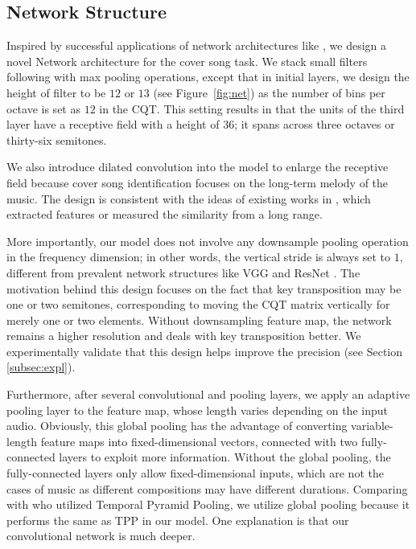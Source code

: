 \documentclass{article}
\newcommand{\figref}[1]{\mbox{Figure~\ref{#1}}}
\begin{document}
\subsection{Network Structure}



Inspired by successful applications of network architectures like \cite{simonyan2014very,he2016deep}, we design a novel Network architecture for the cover song task. We stack small filters following with max pooling operations, except that in initial layers, we design the height of filter to be $12$ or $13$ (see \figref{fig:net}) as the number of bins per octave is set as $12$ in the CQT.
This setting results in that the units of the third layer have a receptive field with a height of $36$; it spans across three octaves or thirty-six semitones. 

We also introduce dilated convolution into the model to enlarge the receptive field because cover song identification focuses on the long-term melody of the music. The design is consistent with the ideas of existing works in \cite{serra2008chroma,bertin2012large}, which extracted features or measured the similarity from a long range. 


More importantly, our model does not involve any downsample pooling operation in the frequency dimension; in other words, the vertical stride is always set to $1$, different from prevalent network structures like VGG and ResNet \cite{simonyan2014very,he2016deep}. The motivation behind this design focuses on the fact that key transposition may be one or two semitones, corresponding to moving the CQT matrix vertically for merely one or two elements. Without downsampling feature map, the network remains a higher resolution and deals with key transposition better. We experimentally validate that this design helps improve the precision (see Section \ref{subsec:expl}). 

Furthermore, after several convolutional and pooling layers, we apply an adaptive pooling layer to the feature map, whose length varies depending on the input audio. Obviously, this global pooling has the advantage of converting variable-length feature maps into fixed-dimensional vectors, connected with two fully-connected layers to exploit more information. Without the global pooling, the fully-connected layers only allow fixed-dimensional inputs, which are not the cases of music as different compositions may have different durations. Comparing with \cite{yu2019temporal} who utilized Temporal Pyramid Pooling, we utilize global pooling because it performs the same as TPP in our model. One explanation is that our convolutional network is much deeper.
\end{document}
